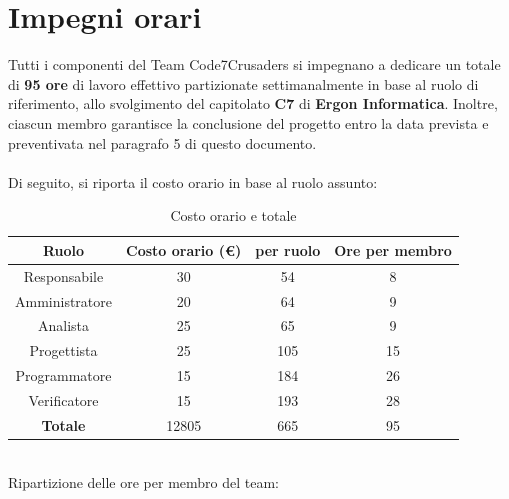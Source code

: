 \documentclass{article}
\begin{document}
\section{Impegni orari}
\label{sec:introduzione}
Tutti i componenti del Team Code7Crusaders si impegnano a dedicare un totale di \textbf{95 ore} di lavoro effettivo partizionate 
settimanalmente in base al ruolo di riferimento, allo svolgimento del capitolato \textbf{C7} di \textbf{Ergon Informatica}. Inoltre,
ciascun membro garantisce la conclusione del progetto entro la data prevista e preventivata nel paragrafo 5 di questo documento.
\\
\\
Di seguito, si riporta il costo orario in base al ruolo assunto:
\begin{table}[!h]
	\begin{center}
		\begin{tabular}{ |c|c|c|c| }
			\hline
			\textbf{Ruolo}          & \textbf{Costo orario} (\euro) &  \textbf{per ruolo}   & \textbf{Ore per membro} \\
			\hline          
			Responsabile   & 30           &     54       &       8        \\
			Amministratore & 20           &     64       &       9        \\
			Analista       & 25           &     65       &       9       \\
			Progettista    & 25           &     105      &       15       \\
			Programmatore  & 15           &     184      &       26       \\
			Verificatore   & 15           &     193      &       28       \\
			\hline
			\textbf{Totale}         &    12805    &     665       &       95       \\
			\hline
		\end{tabular}
        \caption{Costo orario e totale}
    \end{center}
\end{table}
\\
Ripartizione delle ore per membro del team:
\end{document}
